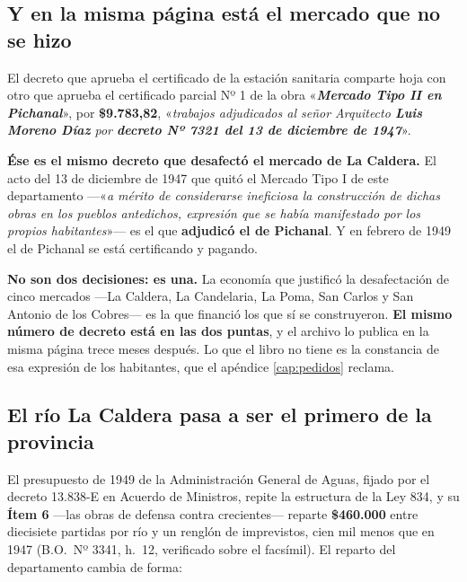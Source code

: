 \subsection*{Y en la misma página está el mercado que no se hizo}

El decreto que aprueba el certificado de la estación sanitaria comparte hoja con otro que
aprueba el certificado parcial Nº 1 de la obra «\textit{\textbf{Mercado Tipo II en
Pichanal}}», por \textbf{\$9.783,82}, «\textit{trabajos adjudicados al señor Arquitecto
\textbf{Luis Moreno Díaz} por \textbf{decreto Nº 7321 del 13 de diciembre de 1947}}».

\begin{cautela}
\textbf{Ése es el mismo decreto que desafectó el mercado de La Caldera.} El acto del 13 de
diciembre de 1947 que quitó el Mercado Tipo I de este departamento ---«\textit{a mérito de
considerarse ineficiosa la construcción de dichas obras en los pueblos antedichos, expresión
que se había manifestado por los propios habitantes}»--- es el que \textbf{adjudicó el de
Pichanal}. Y en febrero de 1949 el de Pichanal se está certificando y pagando.

\textbf{No son dos decisiones: es una.} La economía que justificó la desafectación de cinco
mercados ---La Caldera, La Candelaria, La Poma, San Carlos y San Antonio de los Cobres--- es
la que financió los que sí se construyeron. \textbf{El mismo número de decreto está en las dos
puntas}, y el archivo lo publica en la misma página trece meses después. Lo que el libro no
tiene es la constancia de esa expresión de los habitantes, que el apéndice
\ref{cap:pedidos} reclama.
\end{cautela}

\subsection*{El río La Caldera pasa a ser el primero de la provincia}

El presupuesto de 1949 de la Administración General de Aguas, fijado por el decreto 13.838-E en Acuerdo de Ministros, repite la estructura de la Ley 834, y su \textbf{Ítem 6} ---las obras de
defensa contra crecientes--- reparte \textbf{\$460.000} entre diecisiete partidas por río y un renglón de
imprevistos, cien mil menos que en 1947 (B.O.\ Nº 3341, h.\ 12, verificado sobre el facsímil).
El reparto del departamento cambia de forma:

